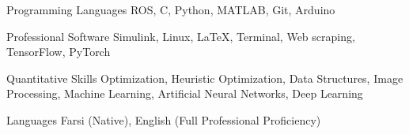 \vspace{-2.0mm}
\begin{cvskills}
	
	\cvskill
	{Programming Languages} %
	{ROS, C, Python, MATLAB, Git, Arduino} %
	
	\cvskill
	{Professional Software} %
	{Simulink, Linux, \textrm{\LaTeX}, Terminal, Web scraping, TensorFlow, PyTorch} %
	
	\cvskill
	{Quantitative Skills} %
	{Optimization, Heuristic Optimization, Data Structures, Image Processing, Machine Learning, \newline Artificial Neural Networks, Deep Learning} %
	
	\cvskill
	{Languages} %
	{Farsi (Native), English (Full Professional Proficiency)} %
	
\end{cvskills}
